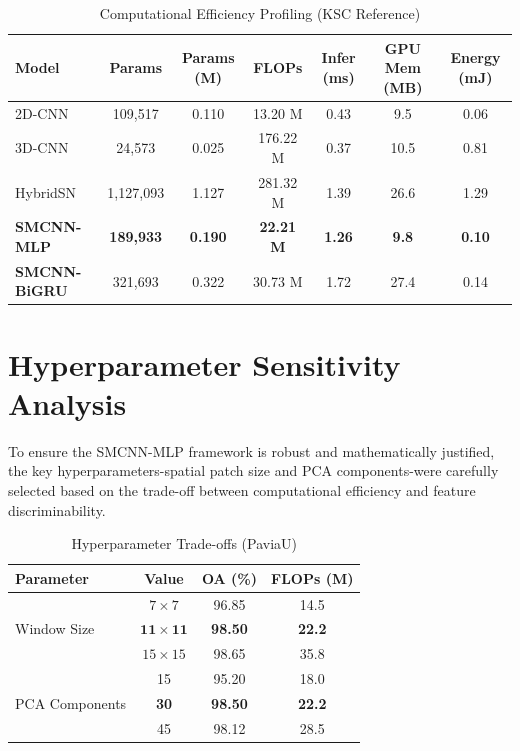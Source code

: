 \documentclass[pdflatex,sn-mathphys-num,iicol]{sn-jnl}
\begin{document}
\begin{table}[htbp]
\centering
\caption{Computational Efficiency Profiling (KSC Reference)}
\label{tab:efficiency}
\footnotesize
\begin{tabular}{lcccccc}
\toprule
\textbf{Model} & \textbf{Params} & \textbf{Params (M)} & \textbf{FLOPs} & \textbf{Infer (ms)} & \textbf{GPU Mem (MB)} & \textbf{Energy (mJ)} \\
\midrule
2D-CNN & 109,517 & 0.110 & 13.20 M & 0.43 & 9.5 & 0.06 \\
3D-CNN & 24,573 & 0.025 & 176.22 M & 0.37 & 10.5 & 0.81 \\
HybridSN & 1,127,093 & 1.127 & 281.32 M & 1.39 & 26.6 & 1.29 \\
\textbf{SMCNN-MLP} & \textbf{189,933} & \textbf{0.190} & \textbf{22.21 M} & \textbf{1.26} & \textbf{9.8} & \textbf{0.10} \\
\textbf{SMCNN-BiGRU} & 321,693 & 0.322 & 30.73 M & 1.72 & 27.4 & 0.14 \\
\bottomrule
\end{tabular}
\end{table}


\section{Hyperparameter Sensitivity Analysis}\label{sec:hyperparameters}

To ensure the SMCNN-MLP framework is robust and mathematically justified, the key hyperparameters-spatial patch size and PCA components-were carefully selected based on the trade-off between computational efficiency and feature discriminability.


\begin{table}[!htbp]
\centering
\caption{Hyperparameter Trade-offs (PaviaU)}
\label{tab:hyperparameters}
\begin{tabular}{lccc}
\toprule
\textbf{Parameter} & \textbf{Value} & \textbf{OA (\%)} & \textbf{FLOPs (M)} \\
\midrule
\multirow{3}{*}{Window Size} & $7 \times 7$ & 96.85 & 14.5 \\
& $\mathbf{11 \times 11}$ & \textbf{98.50} & \textbf{22.2} \\
& $15 \times 15$ & 98.65 & 35.8 \\
\midrule
\multirow{3}{*}{PCA Components} & 15 & 95.20 & 18.0 \\
& \textbf{30} & \textbf{98.50} & \textbf{22.2} \\
& 45 & 98.12 & 28.5 \\
\bottomrule
\end{tabular}
\end{table}
\end{document}
